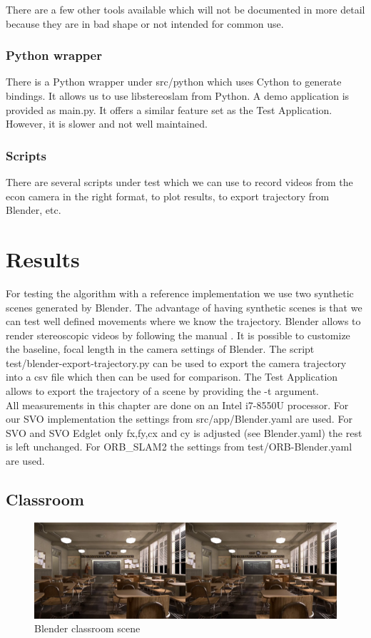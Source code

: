 \documentclass[11pt,a4paper,titlepage,oneside]{report}
\begin{document}
There are a few other tools available which will not be documented in more detail because they are in bad shape or not intended for common use.

\subsection{Python wrapper}
There is a Python wrapper under src/python which uses Cython to generate bindings. It allows us to use libstereoslam from Python. A demo application is provided as main.py. It offers a similar feature set as the Test Application. However, it is slower and not well maintained.

\subsection{Scripts}
There are several scripts under test which we can use to record videos from the econ camera in the right format, to plot results, to export trajectory from Blender, etc.

\chapter{Results}\label{ch:results}

For testing the algorithm with a reference implementation we use two synthetic scenes generated by Blender. The advantage of having synthetic scenes is that we can test well defined movements where we know the trajectory. Blender allows to render stereoscopic videos by following the manual \cite{blender_stereo}. It is possible to customize the baseline, focal length in the camera settings of Blender. The script test/blender-export-trajectory.py can be used to export the camera trajectory into a csv file which then can be used for comparison. The Test Application allows to export the trajectory of a scene by providing the -t argument.\\
All measurements in this chapter are done on an Intel i7-8550U processor. For our SVO implementation the settings from src/app/Blender.yaml are used. For SVO and SVO Edglet only fx,fy,cx and cy is adjusted (see Blender.yaml) the rest is left unchanged. For ORB\_SLAM2 the settings from test/ORB-Blender.yaml are used.

\section{Classroom}
\begin{figure}[H]
  \centering
  \includegraphics[width=1.0\textwidth]{img/blender_classroom_scene.png}
  \caption{Blender classroom scene}\label{fig:blender_classroom_scene}
\end{figure}
\end{document}
